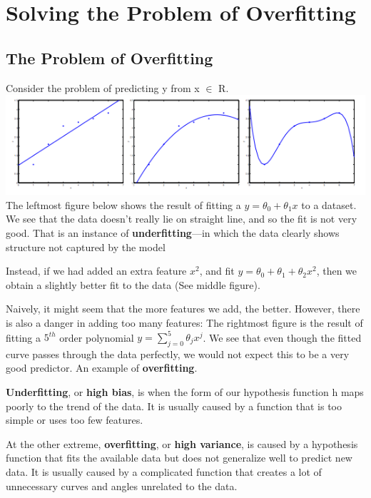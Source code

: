 \documentclass{article}
\begin{document}
\section{Solving the Problem of Overfitting}
\subsection{The Problem of Overfitting}
Consider the problem of predicting y from x $\in$ R.\\
\includegraphics[width=\textwidth]{underfitting-fit-overfitting.png}
The leftmost figure below shows the result of fitting a $y = \theta_0 + \theta_1x$ to a dataset. We see that the data doesn’t really lie on straight line, and so the fit is not very good. That is an instance of \textbf{underfitting}—in which the data clearly shows structure not captured by the model

Instead, if we had added an extra feature $x^2$, and fit $y = \theta_0 + \theta_1 + \theta_2x^2$, then we obtain a slightly better fit to the data (See middle figure).

Naively, it might seem that the more features we add, the better. However, there is also a danger in adding too many features: The rightmost figure is the result of fitting a $5^{th}$ order polynomial $y = \sum_{j=0} ^5 \theta_j x^j$.  We see that even though the fitted curve passes through the data perfectly, we would not expect this to be a very good predictor. An example of \textbf{overfitting}.

\textbf{Underfitting}, or \textbf{high bias}, is when the form of our hypothesis function h maps poorly to the trend of the data. It is usually caused by a function that is too simple or uses too few features.

At the other extreme, \textbf{overfitting}, or \textbf{high variance}, is caused by a hypothesis function that fits the available data but does not generalize well to predict new data. It is usually caused by a complicated function that creates a lot of unnecessary curves and angles unrelated to the data.
\end{document}
